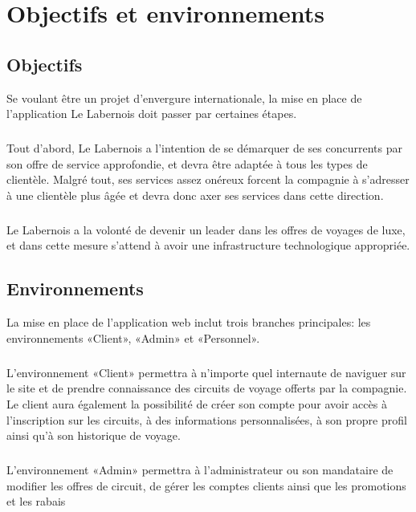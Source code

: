\documentclass{scrreprt}
\def\projectname{Le Labernois}
\begin{document}
\chapter{Objectifs et environnements}
\section{Objectifs}
Se voulant être un projet d'envergure internationale, la mise en place
de l'application \projectname{} doit passer par certaines étapes.

\paragraph{}
Tout d'abord, \projectname{} a l'intention de se démarquer de ses
concurrents par son offre de service approfondie, et devra être adaptée
à tous les types de clientèle. Malgré tout, ses services assez onéreux
forcent la compagnie à s'adresser à une clientèle plus âgée et devra
donc axer ses services dans cette direction.

\paragraph{}
\projectname{} a la volonté de devenir un leader dans les offres de
voyages de luxe, et dans cette mesure s'attend à avoir une
infrastructure technologique appropriée.


\section{Environnements}
La mise en place de l'application web inclut trois branches
principales: les environnements «Client», «Admin» et «Personnel».

\paragraph{}
L'environnement «Client» permettra à n'importe quel internaute de
naviguer sur le site et de prendre connaissance des circuits de voyage
offerts par la compagnie. Le client aura également la possibilité de
créer son compte pour avoir accès à l'inscription sur les circuits, à
des informations personnalisées, à son propre profil ainsi qu'à son
historique de voyage.

\paragraph{}
L'environnement «Admin» permettra à l'administrateur ou son mandataire
de modifier les offres de circuit, de gérer les comptes clients ainsi
que les promotions et les rabais
\end{document}
